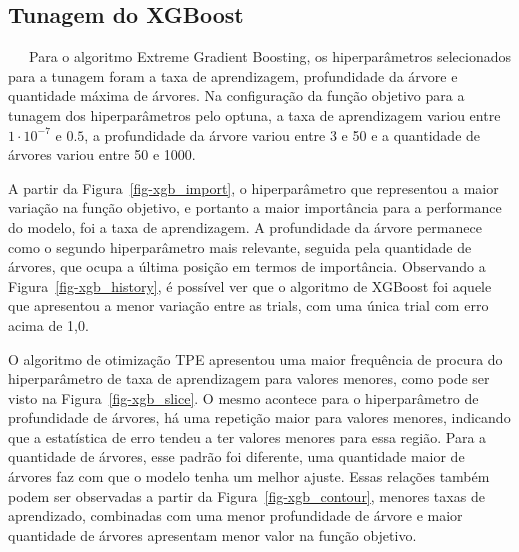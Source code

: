 \documentclass[
  12pt,
  a4paper,
]{scrreprt}
\begin{document}
\subsection{Tunagem do XGBoost}\label{tunagem-do-xgboost}

~~~Para o algoritmo Extreme Gradient Boosting, os hiperparâmetros
selecionados para a tunagem foram a taxa de aprendizagem, profundidade
da árvore e quantidade máxima de árvores. Na configuração da função
objetivo para a tunagem dos hiperparâmetros pelo optuna, a taxa de
aprendizagem variou entre \(1 \cdot 10^{-7}\) e \(0.5\), a profundidade
da árvore variou entre 3 e 50 e a quantidade de árvores variou entre 50
e 1000.

\vspace{12pt}

A partir da Figura~\ref{fig-xgb_import}, o hiperparâmetro que
representou a maior variação na função objetivo, e portanto a maior
importância para a performance do modelo, foi a taxa de aprendizagem. A
profundidade da árvore permanece como o segundo hiperparâmetro mais
relevante, seguida pela quantidade de árvores, que ocupa a última
posição em termos de importância. Observando a
Figura~\ref{fig-xgb_history}, é possível ver que o algoritmo de XGBoost
foi aquele que apresentou a menor variação entre as trials, com uma
única trial com erro acima de 1,0.

\vspace{12pt}

O algoritmo de otimização TPE apresentou uma maior frequência de procura
do hiperparâmetro de taxa de aprendizagem para valores menores, como
pode ser visto na Figura~\ref{fig-xgb_slice}. O mesmo acontece para o
hiperparâmetro de profundidade de árvores, há uma repetição maior para
valores menores, indicando que a estatística de erro tendeu a ter
valores menores para essa região. Para a quantidade de árvores, esse
padrão foi diferente, uma quantidade maior de árvores faz com que o
modelo tenha um melhor ajuste. Essas relações também podem ser
observadas a partir da Figura~\ref{fig-xgb_contour}, menores taxas de
aprendizado, combinadas com uma menor profundidade de árvore e maior
quantidade de árvores apresentam menor valor na função objetivo.
\end{document}
